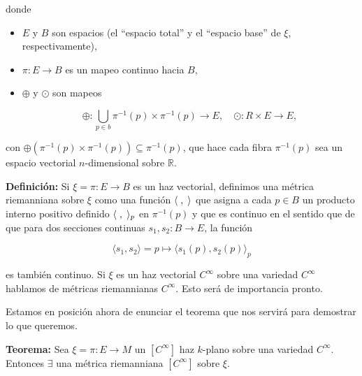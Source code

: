 \documentclass[a4paper,10pt]{article}
\numberwithin{equation}{section}
\newcommand{\definicion}{\textbf{Definición: }}
\newcommand{\teorema}{\textbf{Teorema: }}
\begin{document}
donde 

\begin{itemize}
 \item $E$ y $B$ son espacios (el ``espacio total'' y el ``espacio base'' de 
 $\xi$, respectivamente),
 \item $\pi: E \rightarrow B$ es un mapeo continuo hacia $B$,
 \item $\oplus$ y $\odot$ son mapeos
 
 \begin{equation}
  \oplus: \underset{p \in b}{\bigcup} \pi^{-1}(p) \times \pi^{-1}(p) \rightarrow E, \quad 
  \odot: R \times E \rightarrow E,
 \end{equation}
\end{itemize}

con $\oplus(\pi^{-1}(p) \times \pi^{-1}(p)) \subseteq \pi^{-1}(p)$, que hace 
cada fibra $\pi^{-1}(p)$ sea un espacio vectorial $n$-dimensional sobre 
$\mathbb{R}$.

\vspace{.3cm}

\definicion Si $\xi = \pi: E \rightarrow B$ es un haz vectorial, definimos 
una métrica riemanniana sobre $\xi$ como una función $\langle \hspace{.1cm}, \hspace{.1cm} \rangle$
que asigna a cada $p \in B$ un producto interno positivo definido $\langle \hspace{.1cm}, \hspace{.1cm} \rangle_p$
en $\pi^{-1}(p)$ y que es continuo en el sentido que de que para dos secciones continuas 
$s_1,s_2: B \rightarrow E$, la función

\begin{equation}
 \langle s_1, s_2 \rangle = p \mapsto \langle s_1(p), s_2(p) \rangle_p
\end{equation}

es también continuo. Si $\xi$ es un haz vectorial $C^\infty$ sobre una variedad 
$C^\infty$ hablamos de métricas riemannianas $C^\infty$. Esto será de importancia pronto.

\vspace{.3cm}

Estamos en posición ahora de enunciar el teorema que nos servirá para 
demostrar lo que queremos.

\vspace{.3cm}

\teorema Sea $\xi = \pi: E \rightarrow M$ un $[C^\infty]$ haz $k$-plano
sobre una variedad $C^\infty$. Entonces $\exists$ una métrica riemanniana 
$[C^\infty]$ sobre $\xi$.
\end{document}
